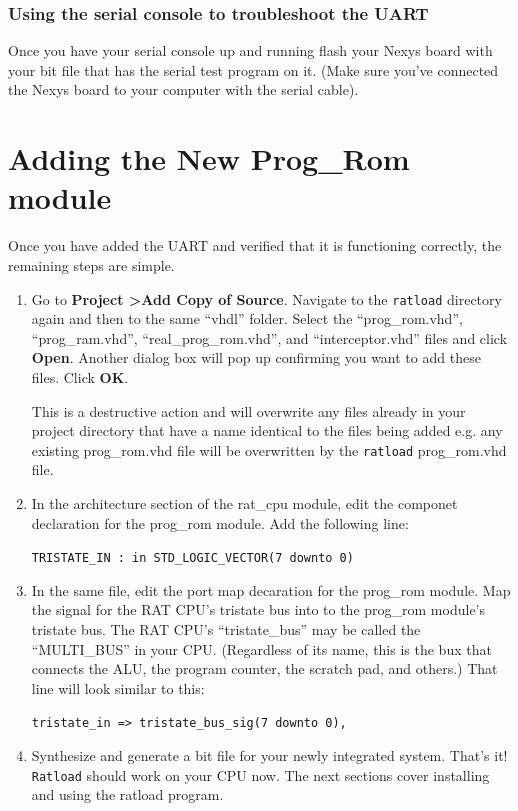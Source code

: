 \documentclass[notitlepage]{article}
\newcommand{\warningsign}{\fontencoding{U}\fontfamily{futs}\Large\selectfont\char 66\relax}
\begin{document}
\subsubsection{Using the serial console to troubleshoot the UART}
Once you have your serial console up and running flash your Nexys board with your bit file that has the serial test program on it. (Make sure you've connected the Nexys board to your computer with the serial cable).

\section{Adding the New Prog\_Rom module}
Once you have added the UART and verified that it is functioning correctly, the remaining steps are simple.
\begin{enumerate}
\item Go to \textbf{Project \textgreater Add Copy of Source}. Navigate to the \texttt{ratload} directory again and then to the same ``vhdl'' folder. Select the ``prog\_rom.vhd'', ``prog\_ram.vhd'', ``real\_prog\_rom.vhd'', and ``interceptor.vhd'' files and click \textbf{Open}. Another dialog box will pop up confirming you want to add these files. Click \textbf{OK}.

\begin{infobox}
  {\warningsign} This is a destructive action and will overwrite any files already in your project directory that have a name identical to the files being added e.g. any existing prog\_rom.vhd file will be overwritten by the \texttt{ratload} prog\_rom.vhd file.
\end{infobox}

\item In the architecture section of the rat\_cpu module, edit the componet declaration for the prog\_rom module. Add the following line:\\
\centerline{\texttt{TRISTATE\_IN : in STD\_LOGIC\_VECTOR(7 downto 0)}}

\item In the same file, edit the port map decaration for the prog\_rom module. Map the signal for the RAT CPU's tristate bus into to the prog\_rom module's tristate bus. The RAT CPU's ``tristate\_bus'' may be called the ``MULTI\_BUS'' in your CPU. (Regardless of its name, this is the bux that connects the ALU, the program counter, the scratch pad, and others.) That line will look similar to this:\\
  \centerline{\texttt{tristate\_in =\textgreater ~tristate\_bus\_sig(7 downto 0),}}

\item Synthesize and generate a bit file for your newly integrated system. That's it! \texttt{Ratload} should work on your CPU now. The next sections cover installing and using the ratload program.
\end{enumerate}
\end{document}

